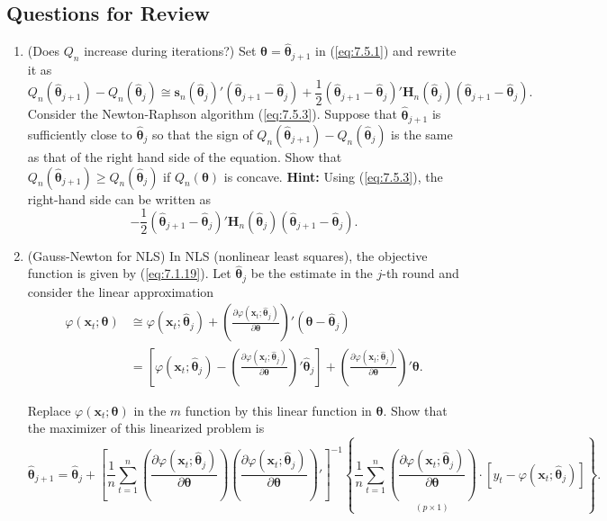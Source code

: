 \subsection*{Questions for Review}

\begin{enumerate}
\item (Does $Q_n$ increase during iterations?) \enspace Set $\bm{\theta} = \hat{\bm{\theta}}_{j+1}$ in (\ref{eq:7.5.1}) and rewrite it as
\[
Q_n(\hat{\bm{\theta}}_{j+1}) - Q_n(\hat{\bm{\theta}}_j) \cong \mathbf{s}_n(\hat{\bm{\theta}}_j)'(\hat{\bm{\theta}}_{j+1} - \hat{\bm{\theta}}_j) + \frac{1}{2}(\hat{\bm{\theta}}_{j+1} - \hat{\bm{\theta}}_j)'\mathbf{H}_n(\hat{\bm{\theta}}_j)(\hat{\bm{\theta}}_{j+1} - \hat{\bm{\theta}}_j).
\]
Consider the Newton-Raphson algorithm (\ref{eq:7.5.3}). Suppose that $\hat{\bm{\theta}}_{j+1}$ is sufficiently close to $\hat{\bm{\theta}}_j$ so that the sign of $Q_n(\hat{\bm{\theta}}_{j+1}) - Q_n(\hat{\bm{\theta}}_j)$ is the same as that of the right hand side of the equation. Show that $Q_n(\hat{\bm{\theta}}_{j+1}) \geq Q_n(\hat{\bm{\theta}}_j)$ if $Q_n(\bm{\theta})$ is concave. \textbf{Hint:} Using (\ref{eq:7.5.3}), the right-hand side can be written as
\[
-\frac{1}{2}(\hat{\bm{\theta}}_{j+1} - \hat{\bm{\theta}}_j)'\mathbf{H}_n(\hat{\bm{\theta}}_j)(\hat{\bm{\theta}}_{j+1} - \hat{\bm{\theta}}_j).
\]

\item (Gauss-Newton for NLS) \enspace In NLS (nonlinear least squares), the objective function is given by (\ref{eq:7.1.19}). Let $\hat{\bm{\theta}}_j$ be the estimate in the $j$-th round and consider the linear approximation
\begin{equation}
\label{eq:7.5.11}
\begin{split}
\varphi(\mathbf{x}_t; \bm{\theta}) &\cong \varphi(\mathbf{x}_t; \hat{\bm{\theta}}_j) + \left(\frac{\partial\varphi(\mathbf{x}_t; \hat{\bm{\theta}}_j)}{\partial\bm{\theta}}\right)'\!(\bm{\theta} - \hat{\bm{\theta}}_j) \\
&= \left[\varphi(\mathbf{x}_t; \hat{\bm{\theta}}_j) - \left(\frac{\partial\varphi(\mathbf{x}_t; \hat{\bm{\theta}}_j)}{\partial\bm{\theta}}\right)'\!\hat{\bm{\theta}}_j\right] + \left(\frac{\partial\varphi(\mathbf{x}_t; \hat{\bm{\theta}}_j)}{\partial\bm{\theta}}\right)'\!\bm{\theta}.
\end{split}
\end{equation}

Replace $\varphi(\mathbf{x}_t; \bm{\theta})$ in the $m$ function by this linear function in $\bm{\theta}$. Show that the maximizer of this linearized problem is
\begin{equation}
\label{eq:7.5.12}
\hat{\bm{\theta}}_{j+1} = \hat{\bm{\theta}}_j + \left[\frac{1}{n}\sum_{t=1}^{n}\left(\frac{\partial\varphi(\mathbf{x}_t; \hat{\bm{\theta}}_j)}{\partial\bm{\theta}}\right)\!\left(\frac{\partial\varphi(\mathbf{x}_t; \hat{\bm{\theta}}_j)}{\partial\bm{\theta}}\right)'\right]^{-1}\!\left\{\frac{1}{n}\sum_{t=1}^{n}\underset{(p \times 1)}{\left(\frac{\partial\varphi(\mathbf{x}_t; \hat{\bm{\theta}}_j)}{\partial\bm{\theta}}\right)} \cdot [y_t - \varphi(\mathbf{x}_t; \hat{\bm{\theta}}_j)]\right\}.
\end{equation}
\end{enumerate}
